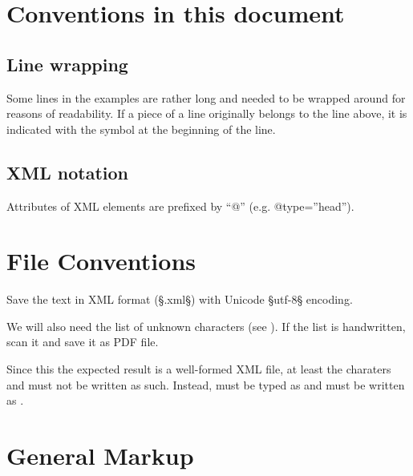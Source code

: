 


\section{Conventions in this document}
\label{sec:conv-this-docum}

\subsection{Line wrapping}
\label{sec:line-wrapping}

Some lines in the examples are rather long and needed to be wrapped around for reasons of readability. If a piece of a line originally belongs to the line above, it is indicated with the symbol  at the beginning of the line.

\subsection{XML notation}
\label{sec:xml-notation}

Attributes of XML elements are prefixed by ``@'' (e.g. @type=”head”).
\section{File Conventions}
\label{section file conventions}

\begin{mainruleLessImportant}
Save the text in XML format (§.xml§) with Unicode §utf-8§ encoding.

We will also need the list of unknown characters (see ). If the list is handwritten, scan it and save it as PDF file.
\end{mainruleLessImportant}

Since this the expected result is a well-formed XML file, at least the charaters \xmex{\&} and \xmex{<} must not be written as such. Instead, \xmex{\&} must be typed as  and \xmex{<} must be written as .


\section{General Markup}


